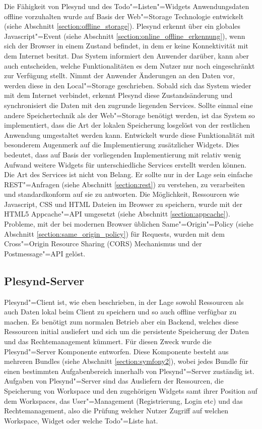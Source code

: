 Die Fähigkeit von Plesynd und des Todo"=Listen"=Widgets Anwendungsdaten offline vorzuhalten wurde auf Basis der Web"=Storage Technologie entwickelt (siehe Abschnitt \ref{section:offline_storage}). Plesynd erkennt über ein globales Javascript"=Event (siehe Abschnitt \ref{section:online_offline_erkennung}), wenn sich der Browser in einem Zustand befindet, in dem er keine Konnektivität mit dem Internet besitzt. Das System informiert den Anwender darüber, kann aber auch entscheiden, welche Funktionalitäten es dem Nutzer nur noch eingeschränkt zur Verfügung stellt. Nimmt der Anwender Änderungen an den Daten vor, werden diese in den Local"=Storage geschrieben. Sobald sich das System wieder mit dem Internet verbindet, erkennt Plesynd diese Zustandsänderung und synchronisiert die Daten mit den zugrunde liegenden Services. Sollte einmal eine andere Speichertechnik als der Web"=Storage benötigt werden, ist das System so implementiert, dass die Art der lokalen Speicherung losgelöst von der restlichen Anwendung umgestaltet werden kann. Entwickelt wurde diese Funktionalität mit besonderem Augenmerk auf die Implementierung zusätzlicher Widgets. Dies bedeutet, dass auf Basis der vorliegenden Implementierung mit relativ wenig Aufwand weitere Widgets für unterschiedliche Services erstellt werden können. Die Art des Services ist nicht von Belang. Er sollte nur in der Lage sein einfache REST"=Anfragen (siehe Abschnitt \ref{section:rest}) zu verstehen, zu verarbeiten und standardkonform auf sie zu antworten. Die Möglichkeit, Ressourcen wie Javascript, CSS und HTML Dateien im Browser zu speichern, wurde mit der HTML5 Appcache"=API umgesetzt (siehe Abschnitt \ref{section:appcache}). Probleme, mit der bei modernen Browser üblichen Same"=Origin"=Policy (siehe Abschnitt \ref{section:same_origin_policy}) für Requests, wurden mit dem Cross"=Origin Resource Sharing (CORS) Mechanismus und der Postmessage"=API gelöst. 

\subsection{Plesynd-Server}
Plesynd"=Client ist, wie eben beschrieben, in der Lage sowohl Ressourcen als auch Daten lokal beim Client zu speichern und so auch offline verfügbar zu machen. Es benötigt zum normalen Betrieb aber ein Backend, welches diese Ressourcen initial ausliefert und sich um die persistente Speicherung der Daten und das Rechtemanagement kümmert. Für diesen Zweck wurde die Plesynd"=Server Komponente entworfen. Diese Komponente besteht aus mehreren Bundles (siehe Abschnitt \ref{section:symfony2}), wobei jedes Bundle für einen bestimmten Aufgabenbereich innerhalb  von Plesynd"=Server zuständig ist. Aufgaben von Plesynd"=Server sind das Ausliefern der Ressourcen, die Speicherung von Workspace und den zugehörigen Widgets samt ihrer Position auf dem Workspaces, das User"=Management (Registrierung, Login etc) und das Rechtemanagement, also die Prüfung welcher Nutzer Zugriff auf welchen Workspace, Widget oder welche Todo"=Liste hat. 

